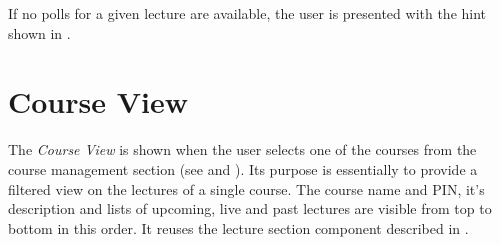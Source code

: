 If no polls for a given lecture are available, the user is presented with the hint shown in \todogrf.

\section{Course View}
\label{section:soa:courseview}

The \emph{Course View} is shown when the user selects one of the courses from the course management section (see  and ). Its purpose is essentially to provide a filtered view on the lectures of a single course.
The course name and PIN, it's description and lists of upcoming, live and past lectures are visible from top to bottom in this order. It reuses the lecture section component described in .

